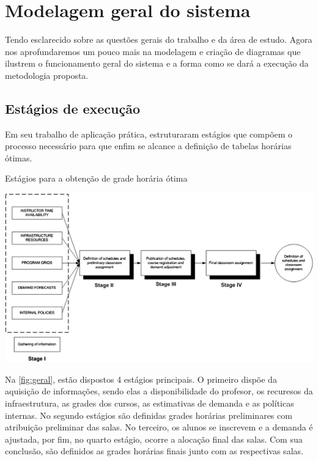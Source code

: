 \chapter{Modelagem geral do sistema} \label{chap:modelagem}

Tendo esclarecido sobre as questões gerais do trabalho e da área de estudo. Agora nos aprofundaremos um pouco mais na modelagem e criação de diagramas que ilustrem o funcionamento geral do sistema e a forma como se dará a execução da metodologia proposta.

\section{Estágios de execução}

Em seu trabalho de aplicação prática,  estruturaram estágios que compõem o processo necessário para que enfim se alcance a definição de tabelas horárias ótimas.

\begin{CenteredFigure}
  \caption{Estágios para a obtenção de grade horária ótima}
  \label{fig:geral}
  \includegraphics[width=\textwidth]{files/img/Arquitetura/Arquitetura-UDP}
\end{CenteredFigure}

Na \autoref{fig:geral}, estão dispostos 4 estágios principais. O primeiro dispõe da aquisição de informações, sendo elas a disponibilidade do profesor, os recuresos da infraestrutura, as grades dos cursos, as estimativas de demanda e as políticas internas. No segundo estágios são definidas grades horárias preliminares com atribuição preliminar das salas. No terceiro, os alunos se inscrevem e a demanda é ajustada, por fim, no quarto estágio, ocorre a alocação final das salas. Com sua conclusão, são definidos as grades horárias finais junto com as respectivas salas.

